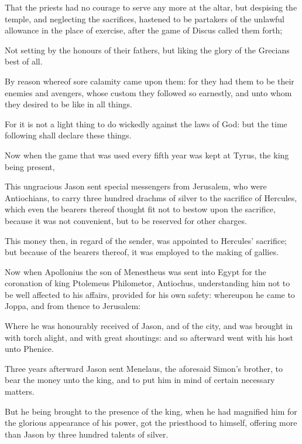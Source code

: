 {\par }{\PP {}That the priests had no courage to serve any more at the altar, but despising the temple, and neglecting the sacrifices, hastened to be partakers of the unlawful allowance in the place of exercise, after the game of Discus called them forth;
\par }{\PP {}Not setting by the honours of their fathers, but liking the glory of the Grecians best of all.
\par }{\PP {}By reason whereof sore calamity came upon them: for they had them to be their enemies and avengers, whose custom they followed so earnestly, and unto whom they desired to be like in all things.
\par }{\PP {}For it is not a light thing to do wickedly against the laws of God: but the time following shall declare these things.
\par }{\PP {}Now when the game that was used every fifth year was kept at Tyrus, the king being present,
\par }{\PP {}This ungracious Jason sent special messengers from Jerusalem, who were Antiochians, to carry three hundred drachms of silver to the sacrifice of Hercules, which even the bearers thereof thought fit not to bestow upon the sacrifice, because it was not convenient, but to be reserved for other charges.
\par }{\PP {}This money then, in regard of the sender, was appointed to Hercules’ sacrifice; but because of the bearers thereof, it was employed to the making of gallies.
\par }{\PP {}Now when Apollonius the son of Menestheus was sent into Egypt for the coronation of king Ptolemeus Philometor, Antiochus, understanding him not to be well affected to his affairs, provided for his own safety: whereupon he came to Joppa, and from thence to Jerusalem:
\par }{\PP {}Where he was honourably received of Jason, and of the city, and was brought in with torch alight, and with great shoutings: and so afterward went with his host unto Phenice.
\par }{\PP {}Three years afterward Jason sent Menelaus, the aforesaid Simon’s brother, to bear the money unto the king, and to put him in mind of certain necessary matters.
\par }{\PP {}But he being brought to the presence of the king, when he had magnified him for the glorious appearance of his power, got the priesthood to himself, offering more than Jason by three hundred talents of silver.
}
